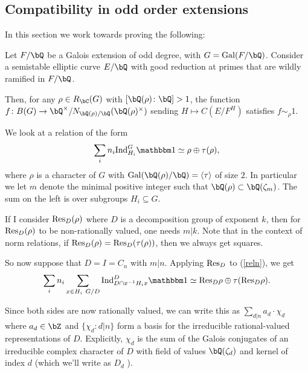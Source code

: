 \subsection{Compatibility in odd order extensions}

In this section we work towards proving the following:

\begin{thm}
    Let $F / \bQ$ be a Galois extension of odd degree, with $G = \Gal(F / \bQ)$. 
    Consider a semistable elliptic curve $E / \bQ$ with good reduction at primes that are wildly ramified in $F / \bQ$.
    
    Then, for any $\rho \in R_{\bC}(G)$ with $[\bQ(\rho)\colon \bQ] > 1$, the function $f \colon B(G) \to
    \bQ^{\times} / N_{\bQ(\rho) / \bQ}(\bQ(\rho)^{\times})$ sending $H \mapsto C(E / F^{H})$ satisfies $f \sim_{\rho} 1$.
\end{thm}

We look at a relation of the form
\begin{equation}\label{reln} 
    \sum_i n_i \Ind_{H_i}^G \trivial \simeq \rho \oplus \tau(\rho),
\end{equation}
where $\rho$ is a character of $G$ with $\Gal(\bQ(\rho) / \bQ) = \langle \tau \rangle $ of size $2$. In particular we let $m$ denote the minimal positive integer such that $\bQ(\rho) \subset \bQ(\zeta_m)$. The sum on the left is over subgroups $H_i \subseteq G$. 

If I consider $\mathrm{Res}_D(\rho)$ where $D$ is a decomposition group of exponent $k$, then for $\mathrm{Res}_D(\rho)$ to be non-rationally valued, one needs $m |k$. Note that in the context of norm relations, if $\mathrm{Res}_D(\rho) = \mathrm{Res}_D(\tau(\rho))$, then we always get squares.

So now suppose that $D = I = C_n$ with $m | n$. Applying $\mathrm{Res}_D$ to (\ref{reln}), we get
\begin{equation}\label{reln-resD}
\sum_i n_i \sum_{x \in H_i \ G / D} \Ind_{D \cap x^{-1}H_i x}^D \trivial \simeq \Res_D \rho \oplus \tau(\Res_D \rho).
\end{equation}

Since both sides are now rationally valued, we can write this as $\sum_{d |n} a_d \cdot \chi_d$ where $a_d \in \bZ$ and $\{ \chi_d \colon d|n \}$ form a basis for the irreducible rational-valued representations of $D$. Explicitly, $\chi_d$ is the sum of the Galois conjugates of an irreducible complex character of $D$ with field of values $\bQ(\zeta_d)$ and kernel of index $d$ (which we'll write as $D_d$ ).

